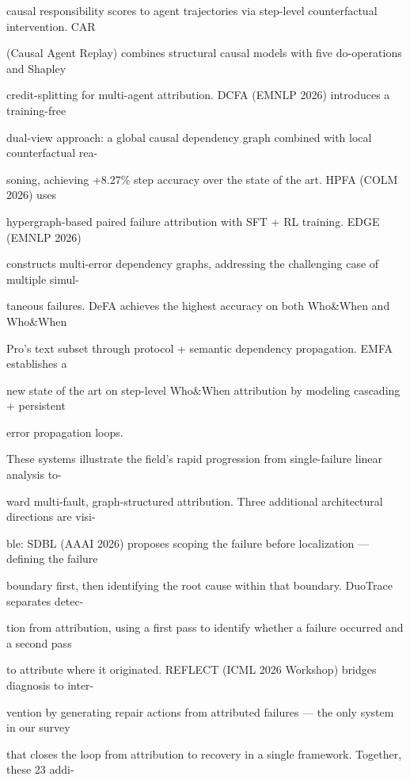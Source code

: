 \begin{flushleft}
\noindent causal responsibility scores to agent trajectories via step-level counterfactual intervention. CAR\par
\noindent (Causal Agent Replay) combines structural causal models with five do-operations and Shapley\par
\noindent credit-splitting for multi-agent attribution. DCFA (EMNLP 2026) introduces a training-free\par
\noindent dual-view approach: a global causal dependency graph combined with local counterfactual rea-\par
\noindent soning, achieving +8.27\% step accuracy over the state of the art. HPFA (COLM 2026) uses\par
\noindent hypergraph-based paired failure attribution with SFT + RL training. EDGE (EMNLP 2026)\par
\noindent constructs multi-error dependency graphs, addressing the challenging case of multiple simul-\par
\noindent taneous failures. DeFA achieves the highest accuracy on both Who\&When and Who\&When\par
\noindent Pro’s text subset through protocol + semantic dependency propagation. EMFA establishes a\par
\noindent new state of the art on step-level Who\&When attribution by modeling cascading + persistent\par
\noindent error propagation loops.\par
\noindent  These systems illustrate the field’s rapid progression from single-failure linear analysis to-\par
\noindent ward multi-fault, graph-structured attribution. Three additional architectural directions are visi-\par
\noindent ble: SDBL (AAAI 2026) proposes scoping the failure before localization — defining the failure\par
\noindent boundary first, then identifying the root cause within that boundary. DuoTrace separates detec-\par
\noindent tion from attribution, using a first pass to identify whether a failure occurred and a second pass\par
\noindent to attribute where it originated. REFLECT (ICML 2026 Workshop) bridges diagnosis to inter-\par
\noindent vention by generating repair actions from attributed failures — the only system in our survey\par
\noindent that closes the loop from attribution to recovery in a single framework. Together, these 23 addi-\par

\end{flushleft}
